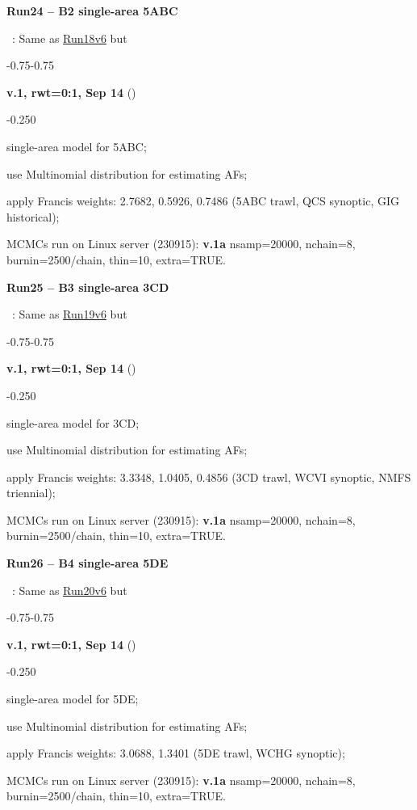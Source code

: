 \hypertarget{R24}{\textbf{Run24 -- B2 single-area 5ABC}}~: Same as \hyperlink{R18}{Run18v6} but
\begin{itemize_csas}{-0.75}{-0.75}
	\item \textbf{v.1, rwt=0:1, Sep 14} ()
	\begin{itemize_csas}{-0.25}{0}
		\item single-area model for 5ABC;
		\item use Multinomial distribution for estimating AFs;
		\item apply Francis weights: 2.7682, 0.5926, 0.7486 (5ABC trawl, QCS synoptic, GIG historical);
		\item MCMCs run on Linux server (230915): \textbf{v.1a} nsamp=20000, nchain=8, burnin=2500/chain, thin=10, extra=TRUE.
	\end{itemize_csas}
\end{itemize_csas}

\hypertarget{R25}{\textbf{Run25 -- B3 single-area 3CD}}~: Same as \hyperlink{R19}{Run19v6} but
\begin{itemize_csas}{-0.75}{-0.75}
	\item \textbf{v.1, rwt=0:1, Sep 14} ()
	\begin{itemize_csas}{-0.25}{0}
		\item single-area model for 3CD;
		\item use Multinomial distribution for estimating AFs;
		\item apply Francis weights: 3.3348, 1.0405, 0.4856 (3CD trawl, WCVI synoptic, NMFS triennial);
		\item MCMCs run on Linux server (230915): \textbf{v.1a} nsamp=20000, nchain=8, burnin=2500/chain, thin=10, extra=TRUE.
	\end{itemize_csas}
\end{itemize_csas}

\hypertarget{R26}{\textbf{Run26 -- B4 single-area 5DE}}~: Same as \hyperlink{R20}{Run20v6} but
\begin{itemize_csas}{-0.75}{-0.75}
	\item \textbf{v.1, rwt=0:1, Sep 14} ()
	\begin{itemize_csas}{-0.25}{0}
		\item single-area model for 5DE;
		\item use Multinomial distribution for estimating AFs;
		\item apply Francis weights: 3.0688, 1.3401 (5DE trawl, WCHG synoptic);
		\item MCMCs run on Linux server (230915): \textbf{v.1a} nsamp=20000, nchain=8, burnin=2500/chain, thin=10, extra=TRUE.
	\end{itemize_csas}
\end{itemize_csas}

